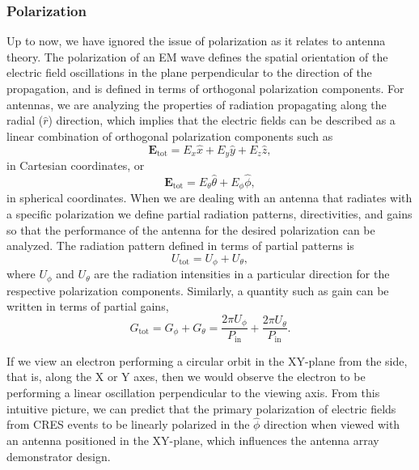 \subsubsection{Polarization}
Up to now, we have ignored the issue of polarization as it relates to antenna theory. The polarization of an EM wave defines the spatial orientation of the electric field oscillations in the plane perpendicular to the direction of the propagation, and is defined in terms of orthogonal polarization components. For antennas, we are analyzing the properties of radiation propagating along the radial ($\hat{r}$) direction, which implies that the electric fields can be described as a linear combination of orthogonal polarization components such as
\begin{equation}
    \mathbf{E}_\mathrm{tot}=E_x\hat{x}+E_y\hat{y}+E_z\hat{z},
\end{equation}
in Cartesian coordinates, or
\begin{equation}
    \mathbf{E}_\mathrm{tot}=E_\theta\hat{\theta}+E_\phi\hat{\phi},
\end{equation}
in spherical coordinates. When we are dealing with an antenna that radiates with a specific polarization we define partial radiation patterns, directivities, and gains so that the performance of the antenna for the desired polarization can be analyzed. The radiation pattern defined in terms of partial patterns is
\begin{equation}
    U_\mathrm{tot}=U_\phi + U_\theta,
\end{equation}
where $U_\phi$ and $U_\theta$ are the radiation intensities in a particular direction for the respective polarization components. Similarly, a quantity such as gain can be written in terms of partial gains,
\begin{equation}
    G_\mathrm{tot}=G_\phi+G_\theta=\frac{2\pi U_\phi}{P_\mathrm{in}}+\frac{2\pi U_\theta}{P_\mathrm{in}}.
\end{equation}

If we view an electron performing a circular orbit in the XY-plane from the side, that is, along the X or Y axes, then we would observe the electron to be performing a linear oscillation perpendicular to the viewing axis. From this intuitive picture, we can predict that the primary polarization of electric fields from CRES events to be linearly polarized in the $\hat\phi$ direction when viewed with an antenna positioned in the XY-plane, which influences the antenna array demonstrator design.

